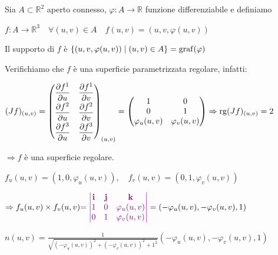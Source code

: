         \begin{esempio}
        \label{esempio:grafico_funzione_superficie_1}
        Sia $A \subset \mathbb{R}^2$ aperto connesso, $\varphi \colon A \to \mathbb{R}$ funzione differenziabile e definiamo 
        
        $f \colon A \to \mathbb{R}^3 \quad \forall (u,v) \in A \quad f(u,v) = (u, v, \varphi(u,v))$

        Il supporto di $f$ è $\left\{ \left(u,v, \varphi(u,v)\right) \mid (u,v) \in A \right\}= \operatorname{graf}(\varphi)$

        Verifichiamo che $f$ è una superficie parametrizzata regolare, infatti:

        $(Jf)_{(u,v)} = \begin{pmatrix}
        \dfrac{\partial f^1}{\partial u} & \dfrac{\partial f^1}{\partial v} \\[2mm]
        \dfrac{\partial f^2}{\partial u} & \dfrac{\partial f^2}{\partial v} \\[2mm]
        \dfrac{\partial f^3}{\partial u} & \dfrac{\partial f^3}{\partial v}
        \end{pmatrix}_{(u,v)} = \begin{pmatrix}
        1 & 0 \\
        0 & 1 \\
        \varphi_u(u,v) & \varphi_v(u,v)
        \end{pmatrix} \Rightarrow \operatorname{rg}(Jf)_{(u,v)} = 2$
        
        $\Rightarrow f$ è una superficie regolare.

        $f_u(u,v) = (1, 0, \varphi_u(u,v)), \quad f_v(u,v) = (0, 1, \varphi_v(u,v))$

        $\Rightarrow f_u(u,v) \times f_v(u,v) \textcolor{violet}{= \begin{vmatrix}
        \mathbf{i} & \mathbf{j} & \mathbf{k} \\
        1 & 0 & \varphi_u(u,v) \\
        0 & 1 & \varphi_v(u,v)
        \end{vmatrix}} =(-\varphi_u(u,v), -\varphi_v(u,v), 1)$

        $n(u,v)= \frac{1}{\sqrt{(-\varphi_u(u,v))^2 + (-\varphi_v(u,v))^2 + 1^2}}(-\varphi_u(u,v), -\varphi_v(u,v), 1)$
        \end{esempio}
